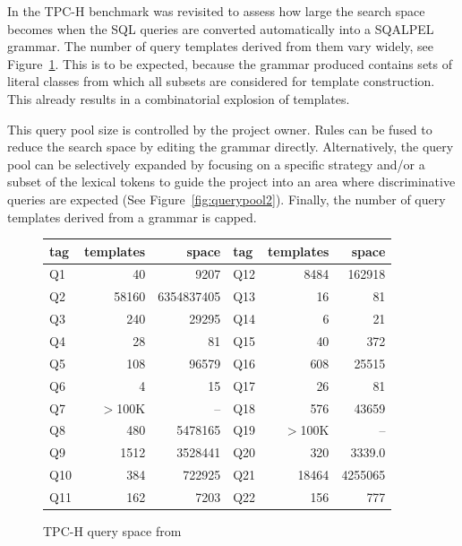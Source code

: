 \documentclass{cidr-2019}
\begin{document}
In \cite{DBLP:conf/sigmod/KerstenKZ18}the TPC-H benchmark was revisited to assess how large the search space becomes when the SQL queries are converted automatically into a {\sc SQALPEL} grammar. The number of query templates derived from them vary
widely, see Figure~\ref{table:tpch-count}. 
This is to be expected, because the grammar produced contains sets of literal classes from which all subsets are considered for template construction. This already results in a combinatorial explosion of templates.


This query pool size is controlled by the project owner.
Rules can be fused to reduce the search space by editing the grammar directly.
Alternatively, the query pool can be selectively expanded by focusing on a
specific strategy and/or a subset
of the lexical tokens to guide the project into an area where discriminative queries are expected (See Figure~\ref{fig:querypool2}). Finally, the number of query
templates derived from a grammar is capped. 
\begin{figure}[t]
{\small 	\begin{tabular}{ | l r  r | l r  r |}\hline
	tag & templates & space & tag & templates & space\\\hline
	Q1 & 40 & 9207  & Q12 & 8484 & 162918 \\
	Q2 & 58160 & 6354837405  & Q13 & 16 & 81\\
	Q3 & 240 & 29295 & Q14 & 6 & 21\\
	Q4 & 28 & 81  & Q15 & 40 & 372 \\
	Q5 & 108 & 96579  & Q16 & 608 & 25515\\
	Q6 & 4 & 15  & Q17 & 26 & 81 \\
	Q7 & $>$100K & --  & Q18 & 576 & 43659\\
	Q8 & 480 & 5478165  & Q19 & $>$100K & --\\
	Q9 & 1512 & 3528441  & Q20 & 320 & 3339.0\\
	Q10 & 384 & 722925  & Q21 & 18464 & 4255065 \\
	Q11 & 162 & 7203  & Q22 & 156& 777\\
	\hline
	\end{tabular}
	\caption{TPC-H query space from \cite{DBLP:conf/sigmod/KerstenKZ18}\label{table:tpch-count}}}
\end{figure}
\end{document}
